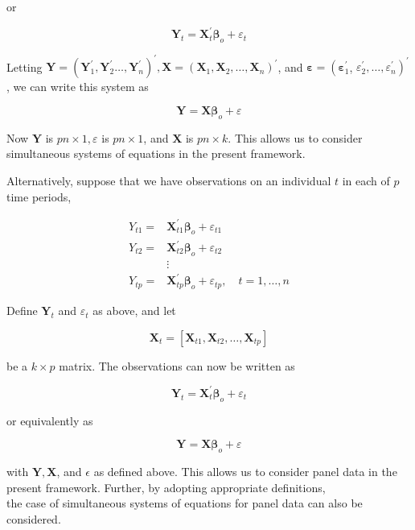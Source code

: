 \documentclass[10pt]{article}
\begin{document}
or

$$
\mathbf{Y}_{t}=\mathbf{X}_{t}^{\prime} \boldsymbol{\beta}_{o}+\varepsilon_{t}
$$

Letting $\mathbf{Y}=\left(\mathbf{Y}_{1}^{\prime}, \mathbf{Y}_{2}^{\prime} \ldots, \mathbf{Y}_{n}^{\prime}\right)^{\prime}, \mathbf{X}=\left(\mathbf{X}_{1}, \mathbf{X}_{2}, \ldots, \mathbf{X}_{n}\right)^{\prime}$, and $\boldsymbol{\varepsilon}=\left(\boldsymbol{\varepsilon}_{1}^{\prime}\right.$, $\left.\varepsilon_{2}^{\prime}, \ldots, \varepsilon_{n}^{\prime}\right)^{\prime}$, we can write this system as

$$
\mathbf{Y}=\mathbf{X} \boldsymbol{\beta}_{o}+\varepsilon
$$

Now $\mathbf{Y}$ is $p n \times 1, \varepsilon$ is $p n \times 1$, and $\mathbf{X}$ is $p n \times k$. This allows us to consider simultaneous systems of equations in the present framework.

Alternatively, suppose that we have observations on an individual $t$ in each of $p$ time periods,

$$
\begin{aligned}
Y_{t 1}= & \mathbf{X}_{t 1}^{\prime} \boldsymbol{\beta}_{o}+\varepsilon_{t 1} \\
Y_{t 2}= & \mathbf{X}_{t 2}^{\prime} \boldsymbol{\beta}_{o}+\varepsilon_{t 2} \\
& \vdots \\
Y_{t p}= & \mathbf{X}_{t p}^{\prime} \boldsymbol{\beta}_{o}+\varepsilon_{t p}, \quad t=1, \ldots, n
\end{aligned}
$$

Define $\mathbf{Y}_{t}$ and $\varepsilon_{t}$ as above, and let

$$
\mathbf{X}_{t}=\left[\mathbf{X}_{t 1}, \mathbf{X}_{t 2}, \ldots, \mathbf{X}_{t p}\right]
$$

be a $k \times p$ matrix. The observations can now be written as

$$
\mathbf{Y}_{t}=\mathbf{X}_{t}^{\prime} \boldsymbol{\beta}_{o}+\varepsilon_{t}
$$

or equivalently as

$$
\mathbf{Y}=\mathbf{X} \boldsymbol{\beta}_{o}+\varepsilon
$$

with $\mathbf{Y}, \mathbf{X}$, and $\epsilon$ as defined above. This allows us to consider panel data in the present framework. Further, by adopting appropriate definitions,\\
the case of simultaneous systems of equations for panel data can also be considered.
\end{document}

